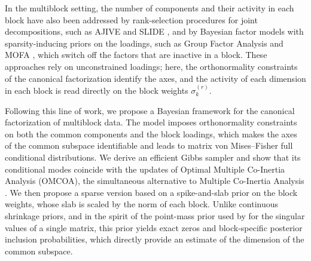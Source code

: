 \documentclass[11pt]{article}
\begin{document}
In the multiblock setting, the number of components and their activity in each block have also been addressed by rank-selection procedures for joint decompositions, such as AJIVE \citep{feng2018} and SLIDE \citep{gaynanova2019}, and by Bayesian factor models with sparsity-inducing priors on the loadings, such as Group Factor Analysis \citep{klami2015} and MOFA \citep{argelaguet2018}, which switch off the factors that are inactive in a block. These approaches rely on unconstrained loadings; here, the orthonormality constraints of the canonical factorization identify the axes, and the activity of each dimension in each block is read directly on the block weights $\sigma_k^{(r)}$.

Following this line of work, we propose a Bayesian framework for the canonical factorization of multiblock data. The model imposes orthonormality constraints on both the common components and the block loadings, which makes the axes of the common subspace identifiable and leads to matrix von Mises--Fisher full conditional distributions. We derive an efficient Gibbs sampler and show that its conditional modes coincide with the updates of Optimal Multiple Co-Inertia Analysis (OMCOA), the simultaneous alternative to Multiple Co-Inertia Analysis \citep{chessel1996}. We then propose a sparse
version based on a spike-and-slab prior \citep{mitchell1988,george1993} on the block weights, whose slab is scaled by the norm of each block. Unlike continuous shrinkage priors, and in the spirit of the point-mass prior used by \citet{hoff2007} for the singular values of a single matrix, this prior yields exact zeros and block-specific posterior inclusion probabilities, which directly provide an estimate of the dimension of the common subspace.  

\end{document}
